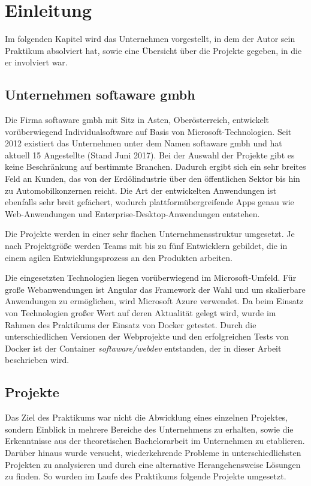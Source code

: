 \chapter{Einleitung}
\label{cha:introduction}

Im folgenden Kapitel wird das Unternehmen vorgestellt, in dem der Autor sein Praktikum absolviert hat, sowie eine Übersicht über die Projekte gegeben, in die er involviert war.

\section{Unternehmen softaware gmbh}
\label{sec:softaware}
Die Firma softaware gmbh mit Sitz in Asten, Oberösterreich, entwickelt vorüberwiegend Individualsoftware auf Basis von Microsoft-Technologien.
Seit 2012 existiert das Unternehmen unter dem Namen softaware gmbh und hat aktuell 15 Angestellte (Stand Juni 2017).
Bei der Auswahl der Projekte gibt es keine Beschränkung auf bestimmte Branchen.
Dadurch ergibt sich ein sehr breites Feld an Kunden, das von der Erdölindustrie über den öffentlichen Sektor bis hin zu Automobilkonzernen reicht.
Die Art der entwickelten Anwendungen ist ebenfalls sehr breit gefächert, wodurch plattformübergreifende Apps genau wie Web-Anwendungen und Enterprise-Desktop-Anwendungen entstehen.

Die Projekte werden in einer sehr flachen Unternehmensstruktur umgesetzt.
Je nach Projektgröße werden Teams mit bis zu fünf Entwicklern gebildet, die in einem agilen Entwicklungsprozess an den Produkten arbeiten.

Die eingesetzten Technologien liegen vorüberwiegend im Microsoft-Umfeld.
Für große Webanwendungen ist Angular das Framework der Wahl und um skalierbare Anwendungen zu ermöglichen, wird Microsoft Azure verwendet.
Da beim Einsatz von Technologien großer Wert auf deren Aktualität gelegt wird, wurde im Rahmen des Praktikums der Einsatz von Docker getestet.
Durch die unterschiedlichen Versionen der Webprojekte und den erfolgreichen Tests von Docker ist der Container \emph{softaware/webdev} entstanden, der in dieser Arbeit beschrieben wird.


\section{Projekte}
\label{sec:projects}

Das Ziel des Praktikums war nicht die Abwicklung eines einzelnen Projektes, sondern Einblick in mehrere Bereiche des Unternehmens zu erhalten, sowie die Erkenntnisse aus der theoretischen Bachelorarbeit im Unternehmen zu etablieren.
Darüber hinaus wurde versucht, wiederkehrende Probleme in unterschiedlichsten Projekten zu analysieren und durch eine alternative Herangehensweise Lösungen zu finden.
So wurden im Laufe des Praktikums folgende Projekte umgesetzt.

